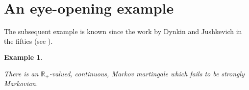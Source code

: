 \documentclass[11pt,a4paper]{article}%
\def\R{{\mathbb R}}
\newtheorem{example}[theorem]{Example}
\numberwithin{equation}{section}
\begin{document}

\section{An eye-opening example}

The subsequent example is known since the work by Dynkin and Jushkevich in the fifties  (see \cite{DyJu56}). 

\begin{example}\label{easy}

There is an $\R_+$-valued, continuous, Markov martingale which fails to be strongly Markovian.
\end{example}
\end{document}
